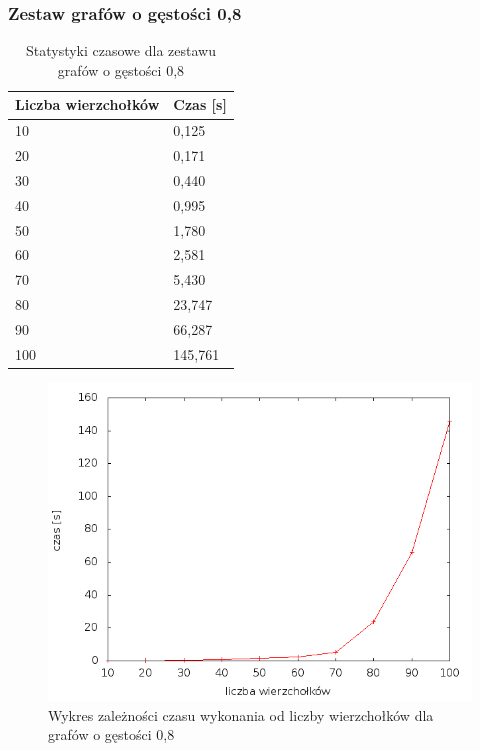 \documentclass[12pt, a4paper]{article}
\begin{document}
\subsubsection*{Zestaw grafów o gęstości 0,8}
\begin{table}[H]
\caption{Statystyki czasowe dla zestawu grafów o gęstości 0,8}
\begin{center}
    \begin{tabular}{|l|l|}
    \hline
    Liczba wierzchołków & Czas [s] \\ \hline
    10 & 0,125 \\ \hline
    20 & 0,171 \\ \hline
    30 & 0,440 \\ \hline
    40 & 0,995 \\ \hline
    50 & 1,780 \\ \hline
    60 & 2,581 \\ \hline
    70 & 5,430 \\ \hline
    80 & 23,747 \\ \hline
    90 & 66,287 \\ \hline
    100 & 145,761 \\ \hline
    \end{tabular}
\end{center}
\end{table}

\begin{figure}[h]
    \begin{center}
	\includegraphics[scale=0.5]{results/img/den/den_08.png}
	\caption{Wykres zależności czasu wykonania od liczby wierzchołków dla grafów o gęstości 0,8}
    \end{center}
\end{figure}
\end{document}
